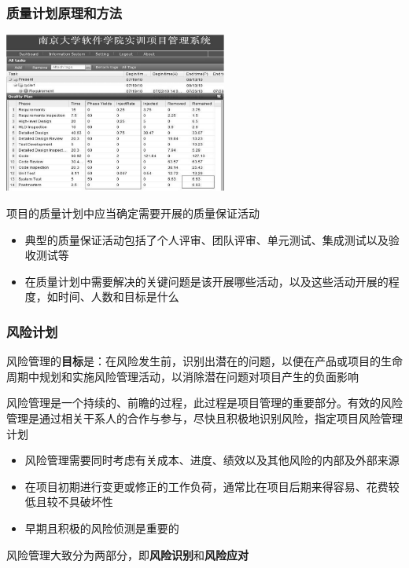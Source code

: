 \subsubsection{质量计划原理和方法}
\begin{table}
    \centering
    \vspace{-4.3em}
    \includegraphics[width=0.55\textwidth]{images/质量计划原理和方法.png}
    \vspace{-10.5em}
\end{table}
项目的质量计划中应当确定需要开展的质量保证活动
\begin{itemize}
    \item 典型的质量保证活动包括了个人评审、团队评审、单元测试、集成测试以及验收测试等
    \item 在质量计划中需要解决的关键问题是该开展哪些活动，以及这些活动开展的程度，如时间、人数和目标是什么
\end{itemize}

\subsubsection{风险计划}
风险管理的\textbf{目标}是：在风险发生前，识别出潜在的问题，以便在产品或项目的生命周期中规划和实施风险管理活动，以消除潜在问题对项目产生的负面影响

风险管理是一个持续的、前瞻的过程，此过程是项目管理的重要部分。有效的风险管理是通过相关干系人的合作与参与，尽快且积极地识别风险，指定项目风险管理计划
\begin{itemize}
    \item 风险管理需要同时考虑有关成本、进度、绩效以及其他风险的内部及外部来源
    \item 在项目初期进行变更或修正的工作负荷，通常比在项目后期来得容易、花费较低且较不具破坏性
    \item 早期且积极的风险侦测是重要的
\end{itemize}

风险管理大致分为两部分，即\textbf{风险识别}和\textbf{风险应对}

